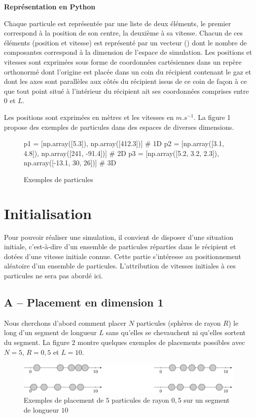 \documentclass[twoside,french,11pt]{VcCours}
\begin{document}
\medskip
\textbf{Représentation en Python}

\smallskip
Chaque particule est représentée par une liste de deux éléments, le premier correspond à la position de son
centre, la deuxième à sa vitesse. Chacun de ces éléments (position et vitesse) est représenté par un vecteur
() dont le nombre de composantes correspond à la dimension de l'espace de simulation.
Les positions et vitesses sont exprimées sous forme de coordonnées cartésiennes dans un repère orthonormé
dont l'origine est placée dans un coin du récipient contenant le gaz et dont les axes sont parallèles aux côtés
du récipient issus de ce coin de façon à ce que tout point situé à l'intérieur du récipient ait ses coordonnées
comprises entre $0$ et $L$.

Les positions sont exprimées en mètres et les vitesses en $m.s^{−1}$. La figure 1 propose des exemples de particules
dans des espaces de diverses dimensions.

\begin{figure}[h]
\centering
\begin{Python*} 
p1 = [np.array([5.3]), np.array([412.3])] # 1D
p2 = [np.array([3.1, 4.8]), np.array([241, -91.4])] # 2D
p3 = [np.array([5.2, 3.2, 2.3]), np.array([-13.1, 30, 26])] # 3D
\end{Python*} 
\caption{Exemples de particules}
\end{figure}

\section*{Initialisation}
Pour pouvoir réaliser une simulation, il convient de disposer d'une situation initiale, c'est-à-dire d'un ensemble
de particules réparties dans le récipient et dotées d'une vitesse initiale connue. Cette partie s'intéresse au
positionnement aléatoire d'un ensemble de particules. L'attribution de vitesses initiales à ces particules ne sera
pas abordé ici.

\subsection*{A -- Placement en dimension 1}
Nous cherchons d'abord comment placer $N$ particules (sphères de rayon $R$) le long d'un segment de longueur $L$
sans qu'elles se chevauchent ni qu'elles sortent du segment. La figure 2 montre quelques exemples de placements
possibles avec $N = 5$, $R = 0,\!5$ et $L = 10$.

\begin{figure}[h]
\centering
\includegraphics[scale=0.5]{DS1-figure2.png}
\caption{Exemples de placement de $5$ particules de rayon $0,\!5$ sur un segment de longueur $10$}
\end{figure}
\end{document}
